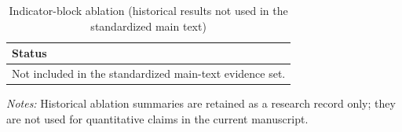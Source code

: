 \begin{table}[htbp]
\centering
\caption{Indicator-block ablation (historical results not used in the standardized main text)}
\label{tab:accessibility_ablation}
\begin{tabular}{l}
\toprule
Status \\
\midrule
Not included in the standardized main-text evidence set. \\
\bottomrule
\end{tabular}
\begin{minipage}{0.92\linewidth}
\footnotesize
\textit{Notes:} Historical ablation summaries are retained as a research record only; they are not used for quantitative claims in the current manuscript.
\end{minipage}
\end{table}

